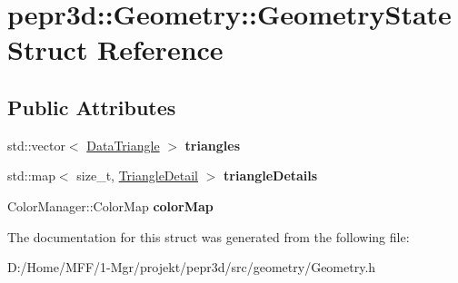 \hypertarget{structpepr3d_1_1_geometry_1_1_geometry_state}{}\section{pepr3d\+::Geometry\+::Geometry\+State Struct Reference}
\label{structpepr3d_1_1_geometry_1_1_geometry_state}
\subsection*{Public Attributes}
\begin{DoxyCompactItemize}
\item 
\mbox{\label{structpepr3d_1_1_geometry_1_1_geometry_state_afd1702b2b655b81ee6d9f140893d440c}} 
std\+::vector$<$ \mbox{\hyperlink{classpepr3d_1_1_data_triangle}{Data\+Triangle}} $>$ {\bfseries triangles}
\item 
\mbox{\label{structpepr3d_1_1_geometry_1_1_geometry_state_a097f2aebe0d060076410e6b92edbc152}} 
std\+::map$<$ size\+\_\+t, \mbox{\hyperlink{classpepr3d_1_1_triangle_detail}{Triangle\+Detail}} $>$ {\bfseries triangle\+Details}
\item 
\mbox{\label{structpepr3d_1_1_geometry_1_1_geometry_state_afee735ce954eea322e684923cc7c0920}} 
Color\+Manager\+::\+Color\+Map {\bfseries color\+Map}
\end{DoxyCompactItemize}


The documentation for this struct was generated from the following file\+:\begin{DoxyCompactItemize}
\item 
D\+:/\+Home/\+M\+F\+F/1-\/\+Mgr/projekt/pepr3d/src/geometry/Geometry.\+h\end{DoxyCompactItemize}
